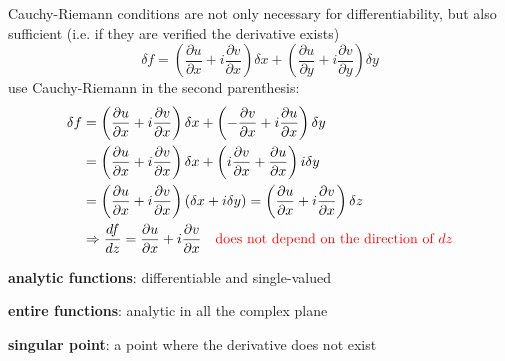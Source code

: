 \documentclass{article}
\begin{document}
\noindent
Cauchy-Riemann conditions are not only necessary for differentiability, but also sufficient (i.e. if they are verified the derivative exists)
\begin{equation}
    \delta f 
= \left( \frac{\partial u}{\partial x} + i \frac{\partial v}{\partial x} \right) \delta x 
+ \left( \frac{\partial u}{\partial y} + i \frac{\partial v}{\partial y} \right) \delta y
\end{equation}
use Cauchy-Riemann in the second parenthesis:
\begin{align*}
    \delta f &= 
\left( \frac{\partial u}{\partial x} + i \frac{\partial v}{\partial x} \right) \delta x
+ \left( -\frac{\partial v}{\partial x} + i \frac{\partial u}{\partial x} \right) \delta y \\
&=
\left( \frac{\partial u}{\partial x} + i \frac{\partial v}{\partial x} \right) \delta x
+ \left( i \frac{\partial v}{\partial x} + \frac{\partial u}{\partial x} \right) i \delta y \\
&=
\left( \frac{\partial u}{\partial x} + i \frac{\partial v}{\partial x} \right)
\left( \delta x + i \delta y \right)
= \left( \frac{\partial u}{\partial x} + i \frac{\partial v}{\partial x} \right) \delta z \\
&\Rightarrow \frac{d f}{d z} = \frac{\partial u}{\partial x} + i \frac{\partial v}{\partial x} \quad \color{red} \text{does not depend on the direction of $dz$} \color{black}
\end{align*}

\vspace{3mm}
\begin{center}    
\noindent
\textbf{analytic functions}: differentiable and single-valued

\noindent
\textbf{entire functions}: analytic in all the complex plane

\noindent
\textbf{singular point}: a point where the derivative does not exist
\end{center}
\end{document}
